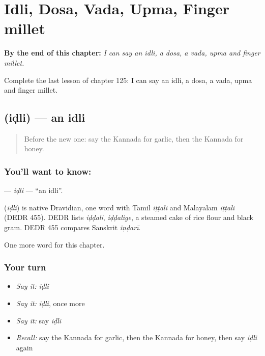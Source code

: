 
\chapter{Idli, Dosa, Vada, Upma, Finger millet}
\label{ch:ka-idli-dosa-vada-upma-finger-millet}

\begin{chapteropening}
\textbf{By the end of this chapter:} \emph{I can say an idli, a dosa, a vada, upma and finger millet.}

Complete the last lesson of chapter 125: I can say an idli, a dosa, a vada, upma and finger millet.
\end{chapteropening}

\section[\texorpdfstring{\kn{ಇಡ್ಲಿ} (iḍli)}{ಇಡ್ಲಿ (iḍli)}]{ (iḍli) — an idli}

\label{lesson:KA-C125-idli}



\begin{quote}
Before the new one: say the Kannada for garlic, then the Kannada for honey.
\end{quote}

\subsection*{You'll want to know: }
\textbf{} — \emph{iḍli} — \textquotedblleft{}an idli\textquotedblright{}.

\begin{cousinweb}
\textbf{} (\emph{iḍli}) is native Dravidian, one word with Tamil \emph{iṭṭali} and Malayalam \emph{iṭṭali} (DEDR 455). DEDR lists \emph{iḍḍali}, \emph{iḍḍalige}, a steamed cake of rice flour and black gram. DEDR 455 compares Sanskrit \emph{iṇḍarī}.
\end{cousinweb}

\begin{grammarlens}[title={What you've built}]
One more word for this chapter.
\end{grammarlens}

\subsection*{Your turn}
\begin{itemize}
\raggedright
  \item \emph{Say it:} \emph{iḍli}
  \item \emph{Say it:} \emph{iḍli}, once more
  \item \emph{Say it:} say \emph{iḍli}
  \item \emph{Recall:} say the Kannada for garlic, then the Kannada for honey, then say \emph{iḍli} again
\end{itemize}

